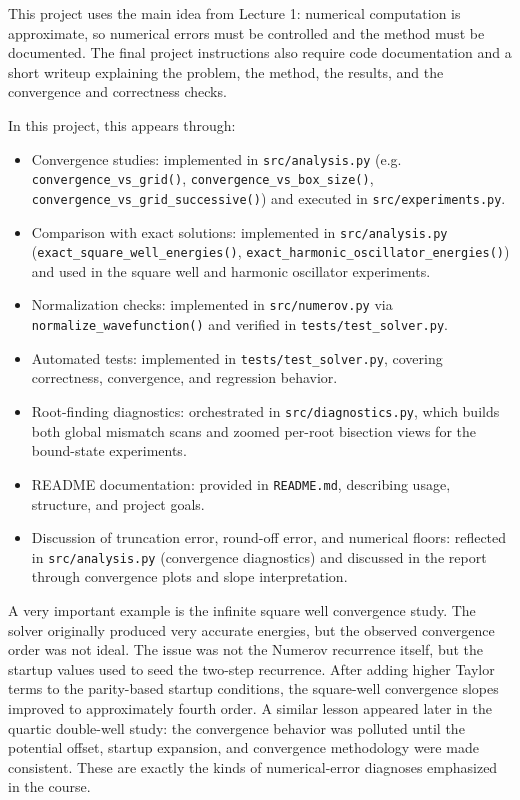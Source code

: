 \documentclass[11pt]{article}
\begin{document}
    This project uses the main idea from Lecture 1: numerical computation is approximate, so numerical errors must be controlled and the method must be documented. The final project instructions also require code documentation and a short writeup explaining the problem, the method, the results, and the convergence and correctness checks.

    In this project, this appears through:
    \begin{itemize}
        \item Convergence studies: implemented in \texttt{src/analysis.py} (e.g. \texttt{convergence\_vs\_grid()}, \texttt{convergence\_vs\_box\_size()}, \texttt{convergence\_vs\_grid\_successive()}) and executed in \texttt{src/experiments.py}.
        \item Comparison with exact solutions: implemented in \texttt{src/analysis.py} (\texttt{exact\_square\_well\_energies()}, \texttt{exact\_harmonic\_oscillator\_energies()}) and used in the square well and harmonic oscillator experiments.
        \item Normalization checks: implemented in \texttt{src/numerov.py} via \texttt{normalize\_wavefunction()} and verified in \texttt{tests/test\_solver.py}.
        \item Automated tests: implemented in \texttt{tests/test\_solver.py}, covering correctness, convergence, and regression behavior.
        \item Root-finding diagnostics: orchestrated in \texttt{src/diagnostics.py}, which builds both global mismatch scans and zoomed per-root bisection views for the bound-state experiments.
        \item README documentation: provided in \texttt{README.md}, describing usage, structure, and project goals.
        \item Discussion of truncation error, round-off error, and numerical floors: reflected in \texttt{src/analysis.py} (convergence diagnostics) and discussed in the report through convergence plots and slope interpretation.
    \end{itemize}

    A very important example is the infinite square well convergence study. The solver originally produced very accurate energies, but the observed convergence order was not ideal. The issue was not the Numerov recurrence itself, but the startup values used to seed the two-step recurrence. After adding higher Taylor terms to the parity-based startup conditions, the square-well convergence slopes improved to approximately fourth order. A similar lesson appeared later in the quartic double-well study: the convergence behavior was polluted until the potential offset, startup expansion, and convergence methodology were made consistent. These are exactly the kinds of numerical-error diagnoses emphasized in the course.
\end{document}
